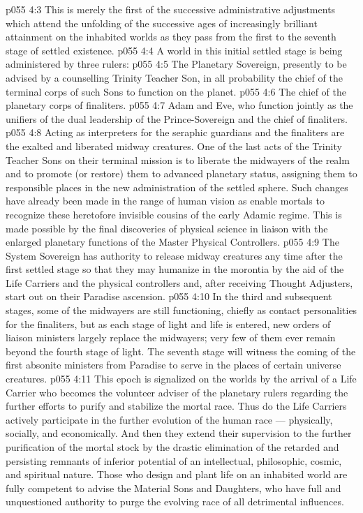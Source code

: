 \vs p055 4:3 This is merely the first of the successive administrative adjustments which attend the unfolding of the successive ages of increasingly brilliant attainment on the inhabited worlds as they pass from the first to the seventh stage of settled existence.
\vs p055 4:4 \bibnobreakspace {} A world in this initial settled stage is being administered by three rulers:
\vs p055 4:5 \bibnobreakspace The Planetary Sovereign, presently to be advised by a counselling Trinity Teacher Son, in all probability the chief of the terminal corps of such Sons to function on the planet.
\vs p055 4:6 \bibnobreakspace The chief of the planetary corps of finaliters.
\vs p055 4:7 \bibnobreakspace Adam and Eve, who function jointly as the unifiers of the dual leadership of the Prince\hyp{}Sovereign and the chief of finaliters.
\vs p055 4:8 \pc Acting as interpreters for the seraphic guardians and the finaliters are the exalted and liberated midway creatures. One of the last acts of the Trinity Teacher Sons on their terminal mission is to liberate the midwayers of the realm and to promote (or restore) them to advanced planetary status, assigning them to responsible places in the new administration of the settled sphere. Such changes have already been made in the range of human vision as enable mortals to recognize these heretofore invisible cousins of the early Adamic regime. This is made possible by the final discoveries of physical science in liaison with the enlarged planetary functions of the Master Physical Controllers.
\vs p055 4:9 The System Sovereign has authority to release midway creatures any time after the first settled stage so that they may humanize in the morontia by the aid of the Life Carriers and the physical controllers and, after receiving Thought Adjusters, start out on their Paradise ascension.
\vs p055 4:10 In the third and subsequent stages, some of the midwayers are still functioning, chiefly as contact personalities for the finaliters, but as each stage of light and life is entered, new orders of liaison ministers largely replace the midwayers; very few of them ever remain beyond the fourth stage of light. The seventh stage will witness the coming of the first absonite ministers from Paradise to serve in the places of certain universe creatures.
\vs p055 4:11 \bibnobreakspace {} This epoch is signalized on the worlds by the arrival of a Life Carrier who becomes the volunteer adviser of the planetary rulers regarding the further efforts to purify and stabilize the mortal race. Thus do the Life Carriers actively participate in the further evolution of the human race --- physically, socially, and economically. And then they extend their supervision to the further purification of the mortal stock by the drastic elimination of the retarded and persisting remnants of inferior potential of an intellectual, philosophic, cosmic, and spiritual nature. Those who design and plant life on an inhabited world are fully competent to advise the Material Sons and Daughters, who have full and unquestioned authority to purge the evolving race of all detrimental influences.
